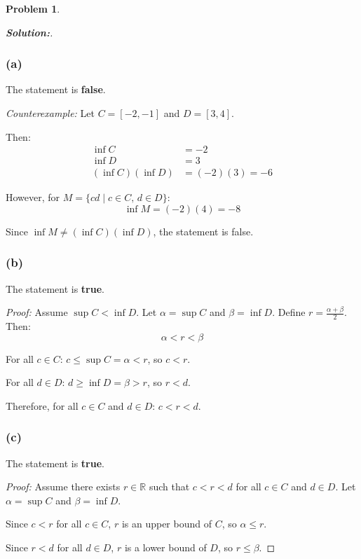 \documentclass[12pt]{article}
\theoremstyle{definition}\newtheorem{problem}{Problem}
\newenvironment{solution}{\begin{proof}[\bfseries\textup{Solution:}]}{\end{proof}}
\begin{document}
\newpage
\begin{problem}
\end{problem}
\begin{solution}
\subsubsection*{(a)}
 The statement is \textbf{false}.
    
    \textit{Counterexample:} Let $C = [-2, -1]$ and $D = [3, 4]$.
    
    Then:
    \begin{align*}
        \inf C &= -2 \\
        \inf D &= 3 \\
        (\inf C)(\inf D) &= (-2)(3) = -6
    \end{align*}
    
    However, for $M = \{cd \mid c \in C,\, d \in D\}$:
    \[ \inf M = (-2)(4) = -8 \]
    
    Since $\inf M \neq (\inf C)(\inf D)$, the statement is false.
    

\subsubsection*{(b)}
 The statement is \textbf{true}.
    
    \textit{Proof:} Assume $\sup C < \inf D$. Let $\alpha = \sup C$ and $\beta = \inf D$.
    Define $r = \frac{\alpha + \beta}{2}$. Then:
    \[ \alpha < r < \beta \]
    
    For all $c \in C$: $c \leq \sup C = \alpha < r$, so $c < r$.
    
    For all $d \in D$: $d \geq \inf D = \beta > r$, so $r < d$.
    
    Therefore, for all $c \in C$ and $d \in D$: $c < r < d$.
    

\subsubsection*{(c)}
The statement is \textbf{true}.
    
    \textit{Proof:} Assume there exists $r \in \mathbb{R}$ such that $c < r < d$ for all $c \in C$ and $d \in D$.
    Let $\alpha = \sup C$ and $\beta = \inf D$.
    
    Since $c < r$ for all $c \in C$, $r$ is an upper bound of $C$, so $\alpha \leq r$.
    
    Since $r < d$ for all $d \in D$, $r$ is a lower bound of $D$, so $r \leq \beta$.
    

\end{solution}
\end{document}
